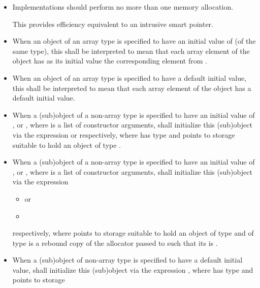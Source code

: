\begin{itemdescr}
\pnum
\remarks
\begin{itemize}
\item
  Implementations should perform no more than one memory allocation.
  \begin{note}
  This provides efficiency equivalent to an intrusive smart pointer.
  \end{note}
\item
  When an object of an array type  is specified to have
  an initial value of  (of the same type),
  this shall be interpreted to mean that
  each array element of the object has as its initial value
  the corresponding element from .
\item
  When an object of an array type is specified to have
  a default initial value,
  this shall be interpreted to mean that each array element of the object
  has a default initial value.
\item
  When a (sub)object of a non-array type  is specified to have
  an initial value of , or ,
  where  is a list of constructor arguments,
   shall initialize this (sub)object
  via the expression  or  respectively,
  where  has type  and points to storage
  suitable to hold an object of type .
\item
  When a (sub)object of a non-array type  is specified to have
  an initial value of , or ,
  where  is a list of constructor arguments,
   shall initialize this (sub)object
  via the expression
  \begin{itemize}
  \item {} or
  \item {}
  \end{itemize}
  respectively,
  where  points to storage
  suitable to hold an object of type  and
   of type  is a rebound copy of
  the allocator  passed to 
  such that its  is .
\item
  When a (sub)object of non-array type  is specified to have
  a default initial value,
   shall initialize this (sub)object
  via the expression ,
  where  has type  and points to storage

\end{itemize}
\end{itemdescr}
